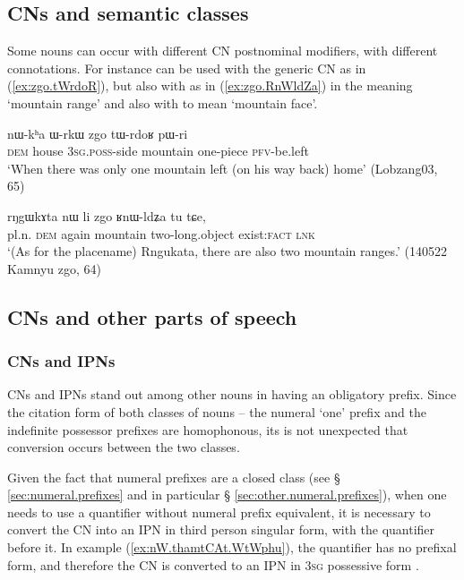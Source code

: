 
\subsection{CNs and semantic classes} \label{sec:CN.classification}


Some nouns can occur with different CN postnominal modifiers, with different connotations. For instance  can be used with the generic CN  as in (\ref{ex:zgo.tWrdoR}), but also with    as in (\ref{ex:zgo.RnWldZa}) in the meaning `mountain range' and also with  to mean `mountain face'.

\begin{exe}
\ex \label{ex:zgo.tWrdoR}
 \gll nɯ-kʰa ɯ-rkɯ zgo tɯ-rdoʁ pɯ-ri \\
\textsc{dem} house \textsc{3sg}.\textsc{poss}-side mountain one-piece \textsc{pfv}-be.left  \\
\glt `When there was only one mountain left (on his way back) home' (Lobzang03, 65)
\end{exe}

\begin{exe}
\ex \label{ex:zgo.RnWldZa}
 \gll rŋgɯkɤta nɯ li zgo ʁnɯ-ldʑa tu tɕe, \\
pl.n. \textsc{dem} again mountain two-long.object exist:\textsc{fact} \textsc{lnk} \\
\glt `(As for the placename) Rngukata, there are also two mountain ranges.' (140522 Kamnyu zgo, 64)
\end{exe}


\subsection{CNs and other parts of speech} \label{sec:CN.parts.of.speech}
\subsubsection{CNs and IPNs}   \label{sec:CN.IPN}
CNs and IPNs stand out among other nouns in having an obligatory prefix. Since the citation form of both classes of nouns -- the numeral `one' prefix  and the indefinite possessor prefixes  are homophonous, its is not unexpected that conversion occurs between the two classes. 

Given the fact that numeral prefixes are a closed class (see § \ref{sec:numeral.prefixes} and in particular § \ref{sec:other.numeral.prefixes}), when one needs to use a quantifier without numeral prefix equivalent, it is necessary to convert the CN into an IPN in third person singular form, with the quantifier before it. In example (\ref{ex:nW.thamtCAt.WtWphu}), the quantifier  has no prefixal form, and therefore the CN  is converted to an IPN in \textsc{3sg} possessive form .

